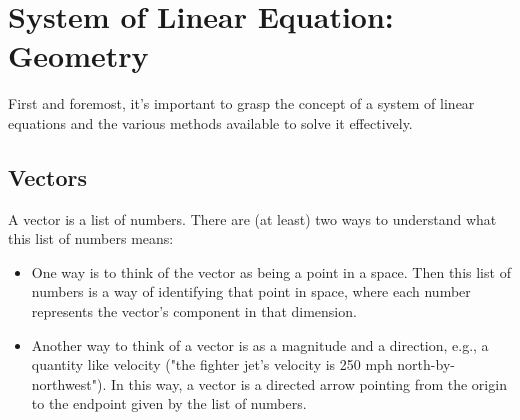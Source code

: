 \documentclass[a4paper,12pt]{article}
\begin{document}
\newpage
\Large \section{System of Linear Equation: Geometry}

\small First and foremost, it's important to grasp the concept of a system of linear equations and the various methods available to solve it effectively.
\subsection{Vectors}
\begin{tcolorbox}[title=Definition,colframe=blue!70!black, colback=blue!5!white]
         A vector is a list of numbers. There are (at least) two ways to understand what this list of numbers means:
\begin{itemize}
    \item One way is to think of the vector as being a point in a space. Then this list of numbers is a way of identifying that point in space, where each number represents the vector’s component in that dimension.
    \item Another way to think of a vector is as a magnitude and a direction, e.g., a quantity like velocity ("the fighter jet’s velocity is 250 mph north-by-northwest"). In this way, a vector is a directed arrow pointing from the origin to the endpoint given by the list of numbers.
\end{itemize}
        \end{tcolorbox}

\begin{center}
\end{center}
\end{document}
